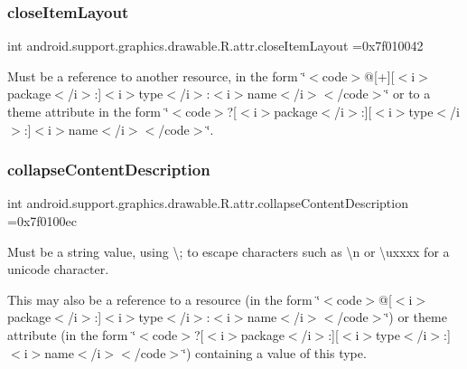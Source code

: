 \subsubsection{\texorpdfstring{close\+Item\+Layout}{closeItemLayout}}
{\footnotesize\ttfamily int android.\+support.\+graphics.\+drawable.\+R.\+attr.\+close\+Item\+Layout =0x7f010042\hspace{0.3cm}{\ttfamily [static]}}

Must be a reference to another resource, in the form \char`\"{}$<$code$>$@\mbox{[}+\mbox{]}\mbox{[}$<$i$>$package$<$/i$>$\+:\mbox{]}$<$i$>$type$<$/i$>$\+:$<$i$>$name$<$/i$>$$<$/code$>$\char`\"{} or to a theme attribute in the form \char`\"{}$<$code$>$?\mbox{[}$<$i$>$package$<$/i$>$\+:\mbox{]}\mbox{[}$<$i$>$type$<$/i$>$\+:\mbox{]}$<$i$>$name$<$/i$>$$<$/code$>$\char`\"{}. \mbox{\label{classandroid_1_1support_1_1graphics_1_1drawable_1_1R_1_1attr_a59581cd712b1f007f705510de1df4256}} 
\subsubsection{\texorpdfstring{collapse\+Content\+Description}{collapseContentDescription}}
{\footnotesize\ttfamily int android.\+support.\+graphics.\+drawable.\+R.\+attr.\+collapse\+Content\+Description =0x7f0100ec\hspace{0.3cm}{\ttfamily [static]}}

Must be a string value, using \textquotesingle{}\textbackslash{};\textquotesingle{} to escape characters such as \textquotesingle{}\textbackslash{}n\textquotesingle{} or \textquotesingle{}\textbackslash{}uxxxx\textquotesingle{} for a unicode character. 

This may also be a reference to a resource (in the form \char`\"{}$<$code$>$@\mbox{[}$<$i$>$package$<$/i$>$\+:\mbox{]}$<$i$>$type$<$/i$>$\+:$<$i$>$name$<$/i$>$$<$/code$>$\char`\"{}) or theme attribute (in the form \char`\"{}$<$code$>$?\mbox{[}$<$i$>$package$<$/i$>$\+:\mbox{]}\mbox{[}$<$i$>$type$<$/i$>$\+:\mbox{]}$<$i$>$name$<$/i$>$$<$/code$>$\char`\"{}) containing a value of this type. \mbox{\label{classandroid_1_1support_1_1graphics_1_1drawable_1_1R_1_1attr_a350e9a353375fb4324486f5f4169224f}} 
